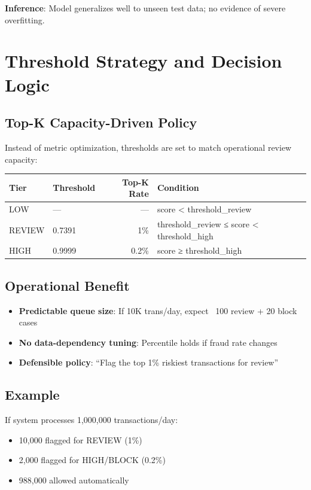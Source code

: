 \documentclass[12pt,a4paper]{article}
\begin{document}
\textbf{Inference}: Model generalizes well to unseen test data; no evidence of severe overfitting.

\section{Threshold Strategy and Decision Logic}

\subsection{Top-K Capacity-Driven Policy}

Instead of metric optimization, thresholds are set to match operational review capacity:

\begin{table}[H]
\centering
\begin{tabular}{|l|l|r|l|}
\hline
\textbf{Tier} & \textbf{Threshold} & \textbf{Top-K Rate} & \textbf{Condition} \\
\hline
LOW & — & — & score < threshold\_review \\
REVIEW & 0.7391 & 1\% & threshold\_review ≤ score < threshold\_high \\
HIGH & 0.9999 & 0.2\% & score ≥ threshold\_high \\
\hline
\end{tabular}
\end{table}

\subsection{Operational Benefit}

\begin{itemize}
    \item \textbf{Predictable queue size}: If 10K trans/day, expect ~100 review + 20 block cases
    \item \textbf{No data-dependency tuning}: Percentile holds if fraud rate changes
    \item \textbf{Defensible policy}: ``Flag the top 1\% riskiest transactions for review''
\end{itemize}

\subsection{Example}

If system processes 1,000,000 transactions/day:
\begin{itemize}
    \item 10,000 flagged for REVIEW (1\%)
    \item 2,000 flagged for HIGH/BLOCK (0.2\%)
    \item 988,000 allowed automatically
\end{itemize}
\end{document}
